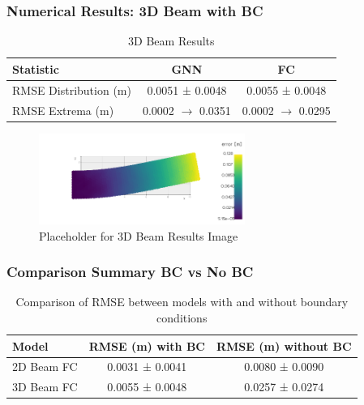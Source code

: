 \documentclass{beamer}
\begin{document}
\begin{frame}
    \frametitle{Numerical Results: 3D Beam with BC}
    \begin{table}[h]
        \small
        \centering
        \begin{tabular}{|l|c|c|}
            \hline
            \textbf{Statistic} & \textbf{GNN} & \textbf{FC} \\ \hline
            RMSE Distribution (m) & 0.0051 ± 0.0048 & 0.0055 ± 0.0048 \\ \hline
            RMSE Extrema (m) & 0.0002 \(\rightarrow\) 0.0351 & 0.0002 \(\rightarrow\) 0.0295 \\ \hline
        \end{tabular}
        \caption{3D Beam Results}
    \end{table}
    \begin{figure}[h]
        \centering
        \includegraphics[width=0.6\textwidth]{Images/output_3D_beam.png}
        \caption{Placeholder for 3D Beam Results Image}
    \end{figure}
\end{frame}


\begin {frame}
    \frametitle{Comparison Summary BC vs No BC}
    \begin{table}[h]
        \small
        \centering
        \begin{tabular}{|l|c|c|}
            \hline
            \textbf{Model} & \textbf{RMSE (m) with BC} & \textbf{RMSE (m) without BC} \\ \hline
            2D Beam FC & 0.0031 ± 0.0041 & 0.0080 ± 0.0090 \\ \hline
            3D Beam FC & 0.0055 ± 0.0048 & 0.0257 ± 0.0274 \\ \hline
        \end{tabular}
        \caption{Comparison of RMSE between models with and without boundary conditions}
    \end{table}
\end{frame}
\end{document}
